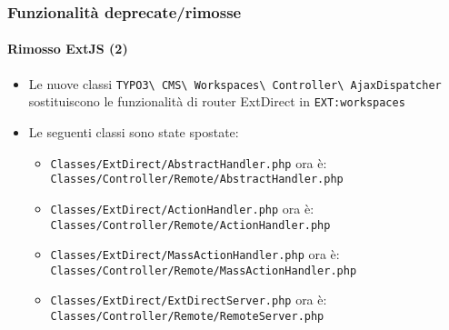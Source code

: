 \begin{frame}[fragile]
	\frametitle{Funzionalità deprecate/rimosse}
	\framesubtitle{Rimosso ExtJS (2)}

	\begin{itemize}
		\item Le nuove classi
			\texttt{TYPO3\textbackslash
				CMS\textbackslash
				Workspaces\textbackslash
				Controller\textbackslash
				AjaxDispatcher}
			sostituiscono le funzionalità di router ExtDirect in \texttt{EXT:workspaces}

		\item Le seguenti classi sono state spostate:

		\begin{itemize}
			\item \smaller\texttt{Classes/ExtDirect/AbstractHandler.php}\newline
				ora è: \texttt{Classes/Controller/Remote/AbstractHandler.php}\normalsize

			\item \smaller\texttt{Classes/ExtDirect/ActionHandler.php}\newline
				ora è: \texttt{Classes/Controller/Remote/ActionHandler.php}\normalsize

			\item \smaller\texttt{Classes/ExtDirect/MassActionHandler.php}\newline
				ora è: \texttt{Classes/Controller/Remote/MassActionHandler.php}\normalsize

			\item \smaller\texttt{Classes/ExtDirect/ExtDirectServer.php}\newline
				ora è: \texttt{Classes/Controller/Remote/RemoteServer.php}\normalsize

		\end{itemize}

	\end{itemize}

\end{frame}
